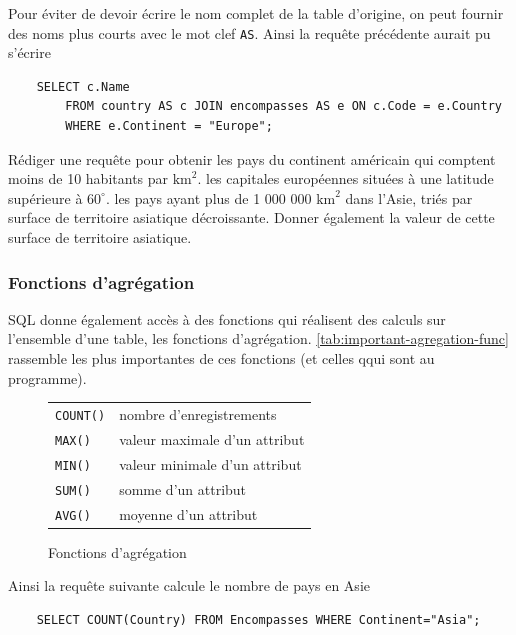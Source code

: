 Pour éviter de devoir écrire le nom complet de la table d'origine, on peut fournir des noms plus courts avec le mot clef \texttt{AS}. Ainsi la requête précédente aurait pu s'écrire

\begin{verbatim}
    SELECT c.Name
        FROM country AS c JOIN encompasses AS e ON c.Code = e.Country
        WHERE e.Continent = "Europe";
\end{verbatim}

\ques Rédiger une requête pour obtenir
\ssques les pays du continent américain qui comptent moins de 10 habitants par $ \textrm{km}^2 $.
\ssques les capitales européennes situées à une latitude supérieure à $ 60^{\circ} $.
\ssques les pays ayant plus de 1 000 000 $ \textrm{km}^2 $ dans l'Asie, triés par surface de territoire asiatique décroissante. Donner également la valeur de cette surface de territoire asiatique.

\subsubsection{Fonctions d'agrégation}

SQL donne également accès à des fonctions qui réalisent des calculs sur l'ensemble d'une table, les fonctions d'agrégation. \autoref{tab:important-agregation-func} rassemble les plus importantes de ces fonctions (et celles qqui sont au programme).

\begin{figure}[h!]
	\centering
	\begin{tabular}{|ll|}
		\hline
		\texttt{COUNT()} & nombre d'enregistrements      \\
		\texttt{MAX()}   & valeur maximale d'un attribut \\
		\texttt{MIN()}   & valeur minimale d'un attribut \\
		\texttt{SUM()}   & somme d'un attribut           \\
		\texttt{AVG()}   & moyenne d'un attribut         \\
		\hline
	\end{tabular}
	\caption{Fonctions d'agrégation}
	\label{tab:important-agregation-func}
\end{figure}

Ainsi la requête suivante calcule le nombre de pays en Asie

\begin{verbatim}
    SELECT COUNT(Country) FROM Encompasses WHERE Continent="Asia";
\end{verbatim}

